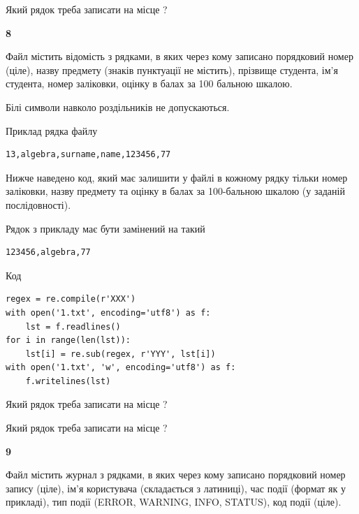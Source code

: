 Який рядок треба записати на місце  ?\par


\newpage

{\begin {center}\textbf{ 8}\end {center}}\par
Файл  містить відомість з рядками, в яких через кому записа\-но поряд\-ковий номер (ціле), назву предмету (знаків пунктуації не містить), прізвище студента, ім'я студента, номер заліковки, оцінку в балах за 100 бальною шкалою.

Білі символи навколо роздільників не допускаються.

Приклад рядка файлу



\begin{verbatim}
13,algebra,surname,name,123456,77
\end{verbatim}


Нижче наведено код, який має залишити у файлі в кожному рядку тільки номер заліковки, назву предмету та оцінку в балах за 100-бальною шкалою (у заданій послі\-дов\-ності).

Рядок з прикладу має бути замінений на такий



\begin{verbatim}
123456,algebra,77
\end{verbatim}




Код



\begin{verbatim}
regex = re.compile(r'XXX')
with open('1.txt', encoding='utf8') as f:
    lst = f.readlines()
for i in range(len(lst)):
    lst[i] = re.sub(regex, r'YYY', lst[i])
with open('1.txt', 'w', encoding='utf8') as f:
    f.writelines(lst)
\end{verbatim}







Який рядок треба записати на місце  ?\par
\vspace{5mm}


Який рядок треба записати на місце  ?\par


\newpage

{\begin {center}\textbf{ 9}\end {center}}\par
Файл  містить журнал з рядками, в яких через кому записано поряд\-ко\-вий номер запису (ціле), ім'я користувача (складається з латиниці), час події (фор\-мат як у прикладі), тип події (ERROR, WARNING, INFO, STATUS), код події (ціле).


